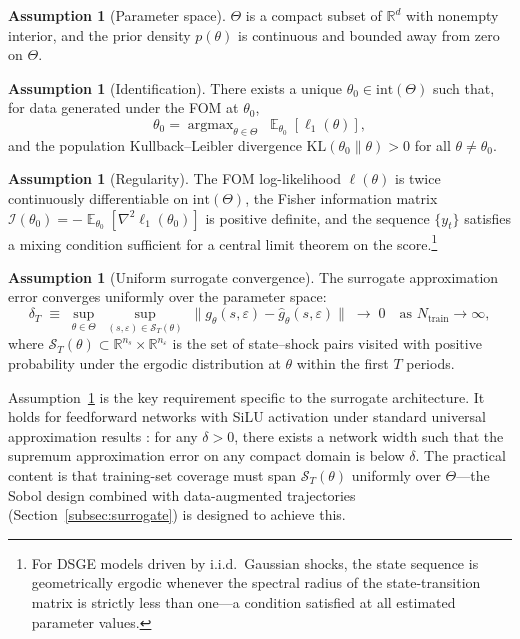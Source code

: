 \documentclass[12pt]{article}
\theoremstyle{plain}
\theoremstyle{definition}
\newtheorem{assumption}[theorem]{Assumption}
\theoremstyle{remark}
\DeclareMathOperator{\E}{\mathbb{E}}
\DeclareMathOperator{\argmax}{argmax}
\newcommand{\R}{\mathbb{R}}
\newcommand{\eps}{\varepsilon}
\begin{document}
\begin{assumption}[Parameter space]
\label{ass:compact}
$\Theta$ is a compact subset of $\R^d$ with nonempty interior, and the prior density $p(\theta)$ is continuous and bounded away from zero on $\Theta$.
\end{assumption}

\begin{assumption}[Identification]
\label{ass:identification}
There exists a unique $\theta_0 \in \text{int}(\Theta)$ such that, for data generated under the FOM at $\theta_0$,
\[
\theta_0 = \argmax_{\theta \in \Theta}\;
  \E_{\theta_0}\!\left[\ell_1(\theta)\right],
\]
and the population Kullback--Leibler divergence $\text{KL}(\theta_0 \| \theta) > 0$ for all $\theta \neq \theta_0$.
\end{assumption}

\begin{assumption}[Regularity]
\label{ass:regularity}
The FOM log-likelihood $\ell(\theta)$ is twice continuously differentiable on $\text{int}(\Theta)$, the Fisher information matrix $\mathcal{I}(\theta_0) = -\E_{\theta_0}[\nabla^2 \ell_1(\theta_0)]$ is positive definite, and the sequence $\{y_t\}$ satisfies a mixing condition sufficient for a central limit theorem on the score.\footnote{For DSGE models driven by i.i.d.\ Gaussian shocks, the state sequence is geometrically ergodic whenever the spectral radius of the state-transition matrix is strictly less than one---a condition satisfied at all estimated parameter values.}
\end{assumption}

\begin{assumption}[Uniform surrogate convergence]
\label{ass:surrogate_convergence}
The surrogate approximation error converges uniformly over the parameter space:
\[
\delta_T \;\equiv\; \sup_{\theta \in \Theta}\;
  \sup_{(s,\eps) \in \mathcal{S}_T(\theta)}\;
  \|g_\theta(s, \eps) - \hat{g}_\theta(s, \eps)\| \;\to\; 0
  \quad \text{as } N_{\text{train}} \to \infty,
\]
where $\mathcal{S}_T(\theta) \subset \R^{n_s} \times \R^{n_\eps}$ is the set of state--shock pairs visited with positive probability under the ergodic distribution at $\theta$ within the first $T$ periods.
\end{assumption}

Assumption~\ref{ass:surrogate_convergence} is the key requirement specific to the surrogate architecture. It holds for feedforward networks with SiLU activation under standard universal approximation results \citep{hornik1989multilayer,cybenko1989approximation}: for any $\delta > 0$, there exists a network width such that the supremum approximation error on any compact domain is below $\delta$. The practical content is that training-set coverage must span $\mathcal{S}_T(\theta)$ uniformly over $\Theta$---the Sobol design combined with data-augmented trajectories (Section~\ref{subsec:surrogate}) is designed to achieve this.
\end{document}
